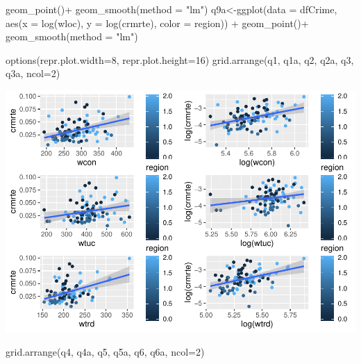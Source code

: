 \documentclass[]{article}
\newenvironment{Shaded}{}{}
\newcommand{\DataTypeTok}[1]{#1}
\newcommand{\DecValTok}[1]{#1}
\newcommand{\KeywordTok}[1]{\textcolor[rgb]{0.00,0.00,1.00}{#1}}
\newcommand{\NormalTok}[1]{#1}
\newcommand{\OperatorTok}[1]{#1}
\newcommand{\StringTok}[1]{\textcolor[rgb]{0.00,0.50,0.50}{#1}}
\begin{document}
\begin{Shaded}
\begin{Highlighting}[]
\StringTok{      }\KeywordTok{geom_point}\NormalTok{()}\OperatorTok{+}
\StringTok{  }\KeywordTok{geom_smooth}\NormalTok{(}\DataTypeTok{method =} \StringTok{"lm"}\NormalTok{)}
\NormalTok{q9a<-}\KeywordTok{ggplot}\NormalTok{(}\DataTypeTok{data =}\NormalTok{ dfCrime, }\KeywordTok{aes}\NormalTok{(}\DataTypeTok{x =} \KeywordTok{log}\NormalTok{(wloc), }\DataTypeTok{y =} \KeywordTok{log}\NormalTok{(crmrte), }\DataTypeTok{color =}\NormalTok{ region)) }\OperatorTok{+}\StringTok{ }
\StringTok{      }\KeywordTok{geom_point}\NormalTok{()}\OperatorTok{+}
\StringTok{  }\KeywordTok{geom_smooth}\NormalTok{(}\DataTypeTok{method =} \StringTok{"lm"}\NormalTok{)}

\KeywordTok{options}\NormalTok{(}\DataTypeTok{repr.plot.width=}\DecValTok{8}\NormalTok{, }\DataTypeTok{repr.plot.height=}\DecValTok{16}\NormalTok{)}
\KeywordTok{grid.arrange}\NormalTok{(q1, q1a, q2, q2a, q3, q3a, }\DataTypeTok{ncol=}\DecValTok{2}\NormalTok{)}
\end{Highlighting}
\end{Shaded}

\includegraphics{Bagnard_Gaustad_Hartman_Leung_Lab_3_files/figure-latex/unnamed-chunk-47-1.pdf}

\begin{Shaded}
\begin{Highlighting}[]
\KeywordTok{grid.arrange}\NormalTok{(q4, q4a, q5, q5a, q6, q6a, }\DataTypeTok{ncol=}\DecValTok{2}\NormalTok{)}
\end{Highlighting}
\end{Shaded}
\end{document}
